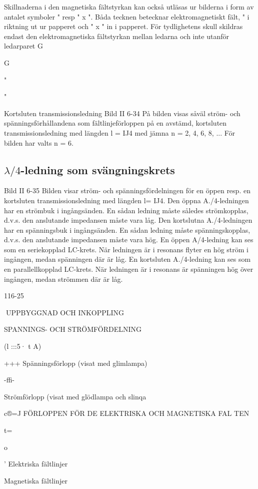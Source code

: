 {{Skillnaderna i den magnetiska fältstyrkan
kan också utläsas ur bilderna i form av
antalet symboler "
resp " x ". Båda
tecknen betecknar elektromagnetiskt fält, "
i riktning ut ur papperet och " x " in i
papperet. För tydlighetens skull skildras
endast den elektromagnetiska fältstyrkan
mellan ledarna och inte utanför ledarparet
G

G

"

"

Kortsluten transmissionsledning
Bild II 6-34
På bilden visas såväl ström- och spänningsförhållandena som fältlinjeförloppen
på en avstämd, kortsluten transmissionsledning med längden l = IJ4 med jämna n =
2, 4, 6, 8, ... För bilden har valts n = 6.

\subsection{\(\lambda/4\)-ledning som svängningskrets}

Bild II 6-35
Bilden visar ström- och spänningsfördelningen för en öppen resp. en kortsluten
transmissionsledning med längden l= IJ4.
Den öppna A./4-ledningen har en strömbuk i ingångsänden. En sådan ledning måste
således strömkopplas, d.v.s. den anslutande impedansen måste vara låg.
Den kortslutna A./4-ledningen har en
spänningsbuk i ingångsänden. En sådan
ledning måste spänningskopplas, d.v.s. den
anslutande impedansen måste vara hög.
En öppen A/4-ledning kan ses som en
seriekopplad LC-krets. När ledningen är i
resonans flyter en hög ström i ingången,
medan spänningen där är låg.
En kortsluten A./4-ledning kan ses som
en parallellkopplad LC-krets. När ledningen
är i resonans är spänningen hög över ingången, medan strömmen där är låg.

116-25

UPPBYGGNAD OCH INKOPPLING

SPANNINGS- OCH STRÖMFÖRDELNING

(l :::5· t A)

+++
Spänningsförlopp
(visat med glimlampa)

-ffi-

Strömförlopp
(visat med glödlampa
och slinqa

c®=J
FÖRLOPPEN FÖR DE ELEKTRISKA OCH MAGNETISKA FAL TEN

t=

o

' Elektriska fältlinjer

Magnetiska fältlinjer

}}
